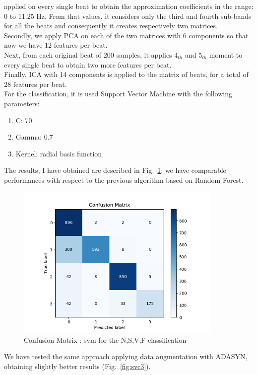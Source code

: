 \documentclass[LaM,binding=0.6cm]{sapthesis}
\begin{document}
applied on every single beat to obtain the approximation coefficients in the range: 0 to 11.25 Hz. From that values, it considers only the third and fourth sub-bands for all the beats and consequently it creates respectively two matrices.\\Secondly, we apply PCA on each of the two matrices with 6 components so that now we have 12 features per beat.\\Next, from each original beat of 200 samples, it applies $4_{th}$ and $5_{th}$ moment to every single beat to obtain two more features per beat.\\Finally, ICA with 14 components is applied to the matrix of beats, for a total of 28 features per beat.\\For the classification, it is used Support Vector Machine with the following parameters:
\begin{enumerate}
\item C: 70
\item Gamma: 0.7
\item Kernel: radial basis function
\end{enumerate}
The results, I have obtained are described in Fig.~\ref{fig:svc2}: we have comparable performances with respect to the previous algorithm based on Random Forest.
\begin{figure}[H]  \centering
    \includegraphics[width=100mm,scale=0.7]{confusion-matrix-linear-not-linear-no-aug-smaller-test.png}
    \caption{Confusion Matrix : svm for the N,S,V,F classification}
    \label{fig:svc2}
\end{figure}
We have tested the same approach applying data augmentation with ADASYN, obtaining slightly better results (Fig.~\ref{fig:svc3}).
\end{document}
